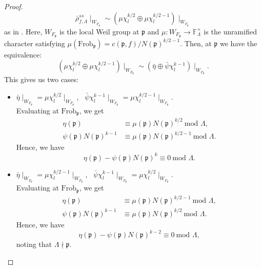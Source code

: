 \documentclass[a4paper,oneside]{amsart}
\theoremstyle{plain}
\theoremstyle{definition}
\begin{document}
\begin{proof}
\begin{equation*}
        \bar{\rho}_{f, \Lambda}^{ss} \mid_{W_{F_\mathfrak{p}}} \sim (\mu \chi_l^{k/2} \oplus \mu\chi_l^{k/2-1})\mid_{W_{F_{\mathfrak{p}}}}
    \end{equation*}
    as in \cite{schmidt}. Here, $W_{F_\mathfrak{p}}$ is the local Weil group at $\mathfrak{p}$ and $\mu : W_{F_{\mathfrak{p}}} \rightarrow \mathbb{F}_{\Lambda}^\times$ is the unramified character satisfying $\mu(\text{Frob}_\mathfrak{p})=c(\mathfrak{p},f)/N(\mathfrak{p})^{k/2-1}$. Then, at $\mathfrak{p}$ we have the equivalence:
    \begin{equation*}
        (\mu \chi_l^{k/2} \oplus \mu\chi_l^{k/2-1})\mid_{W_{F_{\mathfrak{p}}}} \sim (\bar{\eta} \oplus \bar{\psi}\chi_l^{k-1}) \mid_{W_{F_{\mathfrak{p}}}}.
    \end{equation*}
    This gives us two cases:
    \begin{itemize}
        \item[(A)] $\bar{\eta}\mid_{W_{F_\mathfrak{p}}} = \mu \chi_l^{k/2} \mid_{W_{F_\mathfrak{p}}}$, \ $\bar{\psi}\chi_l^{k-1}\mid_{W_{F_\mathfrak{p}}} = \mu \chi_l^{k/2-1} \mid_{W_{F_\mathfrak{p}}}$. \\
        Evaluating at $\text{Frob}_\mathfrak{p}$, we get
        \begin{align*}
            \eta(\mathfrak{p}) &\equiv \mu(\mathfrak{p})N(\mathfrak{p})^{k/2} \ \text{mod } \Lambda, \\
            \psi(\mathfrak{p})N(\mathfrak{p})^{k-1} &\equiv \mu(\mathfrak{p})N(\mathfrak{p})^{k/2-1} \ \text{mod } \Lambda.
        \end{align*}
        Hence, we have
        \begin{equation*}
            \eta(\mathfrak{p}) - \psi(\mathfrak{p})N(\mathfrak{p})^k \equiv 0 \ \text{mod } \Lambda.
        \end{equation*}
        \item[(B)] $\bar{\eta}\mid_{W_{F_\mathfrak{p}}} = \mu \chi_l^{k/2 - 1} \mid_{W_{F_\mathfrak{p}}}$, \ $\bar{\psi}\chi_l^{k-1}\mid_{W_{F_\mathfrak{p}}} = \mu \chi_l^{k/2} \mid_{W_{F_\mathfrak{p}}}$. \\
        Evaluating at $\text{Frob}_\mathfrak{p}$, we  get
        \begin{align*}
            \eta(\mathfrak{p}) &\equiv \mu(\mathfrak{p})N(\mathfrak{p})^{k/2 - 1} \ \text{mod } \Lambda, \\
            \psi(\mathfrak{p})N(\mathfrak{p})^{k-1} &\equiv \mu(\mathfrak{p})N(\mathfrak{p})^{k/2} \ \text{mod } \Lambda.
        \end{align*}
        Hence, we have 
        \begin{equation*}
            \eta(\mathfrak{p}) - \psi(\mathfrak{p})N(\mathfrak{p})^{k-2} \equiv 0 \ \text{mod } \Lambda,
        \end{equation*}
        noting that $\Lambda \nmid \mathfrak{p}$. 


\end{itemize}
\end{proof}
\end{document}
